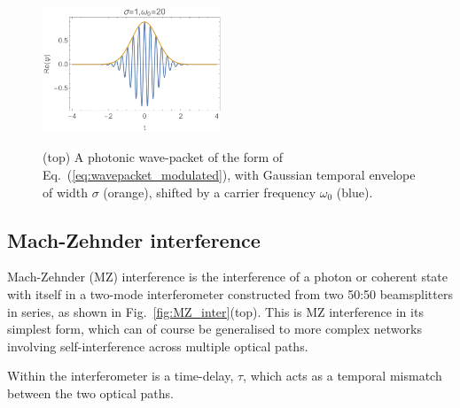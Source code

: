\begin{figure}[!htbp]
	\includegraphics[clip=true, width=0.475\textwidth]{wavepacket} \\
	\captionspacefig \caption{(top) A photonic wave-packet of the form of Eq.~(\ref{eq:wavepacket_modulated}), with Gaussian temporal envelope of width $\sigma$ (orange), shifted by a carrier frequency $\omega_0$ (blue).} \label{fig:HOM_vs_MZ}
\end{figure}

%
%

\subsection{Mach-Zehnder interference}  \label{sec:MZ_inter}

Mach-Zehnder (MZ) interference is the interference of a photon or coherent state with itself in a two-mode interferometer constructed from two 50:50 beamsplitters in series, as shown in Fig.~\ref{fig:MZ_inter}(top). This is MZ interference in its simplest form, which can of course be generalised to more complex networks involving self-interference across multiple optical paths.

Within the interferometer is a time-delay, $\tau$, which acts as a temporal mismatch between the two optical paths. 

